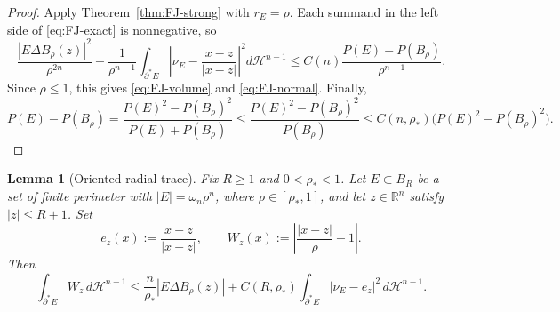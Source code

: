 \documentclass[11pt]{amsart}
\newtheorem{lemma}[theorem]{Lemma}
\theoremstyle{definition}
\newcommand{\R}{\mathbb R}
\newcommand{\rstar}{\rho_*}
\newcommand{\Hn}{\mathcal H^{n-1}}
\newcommand{\Per}{P}
\begin{document}
\begin{proof}
Apply Theorem~\ref{thm:FJ-strong} with \(r_E=\rho\).  Each summand in the
left side of \eqref{eq:FJ-exact} is nonnegative, so
\[
   \frac{|E\Delta B_\rho(z)|^2}{\rho^{2n}}
   +
   \frac1{\rho^{n-1}}
   \int_{\partial^*E}
      \left|\nu_E-\frac{x-z}{|x-z|}\right|^2d\Hn
   \le
   C(n)\frac{\Per(E)-\Per(B_\rho)}{\rho^{n-1}} .
\]
Since \(\rho\le1\), this gives \eqref{eq:FJ-volume} and
\eqref{eq:FJ-normal}.  Finally,
\[
   \Per(E)-\Per(B_\rho)
   =
   \frac{\Per(E)^2-\Per(B_\rho)^2}{\Per(E)+\Per(B_\rho)}
   \le
   \frac{\Per(E)^2-\Per(B_\rho)^2}{\Per(B_\rho)}
   \le C(n,\rstar)\bigl(\Per(E)^2-\Per(B_\rho)^2\bigr).
\]
\end{proof}

\begin{lemma}[Oriented radial trace]\label{lem:oriented-radial-trace}
Fix \(R\ge1\) and \(0<\rstar<1\).  Let \(E\subset B_R\) be a set of finite
perimeter with \(|E|=\omega_n\rho^n\), where \(\rho\in[\rstar,1]\), and
let \(z\in\R^n\) satisfy \(|z|\le R+1\).  Set
\[
   e_z(x):=\frac{x-z}{|x-z|},\qquad
   W_z(x):=\left|\frac{|x-z|}{\rho}-1\right|.
\]
Then
\begin{equation}\label{eq:oriented-radial-trace}
   \int_{\partial^*E} W_z\,d\Hn
   \le
   \frac{n}{\rstar}|E\Delta B_\rho(z)|
   +
   C(R,\rstar)
   \int_{\partial^*E}|\nu_E-e_z|^2\,d\Hn .
\end{equation}
\end{lemma}
\end{document}
